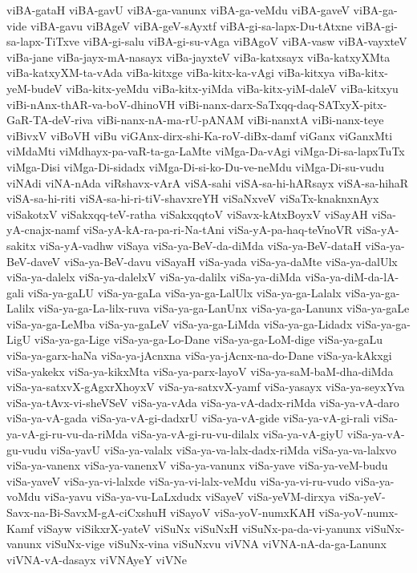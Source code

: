 {viBA-gataH
viBA-gavU
viBA-ga-vanunx
viBA-ga-veMdu
viBA-gaveV
viBA-ga-vide
viBA-gavu
viBAgeV
viBA-geV-sAyxtf
viBA-gi-sa-lapx-Du-tAtxne
viBA-gi-sa-lapx-TiTxve
viBA-gi-salu
viBA-gi-su-vAga
viBAgoV
viBA-vasw
viBA-vayxteV
viBa-jane
viBa-jayx-mA-nasayx
viBa-jayxteV
viBa-katxsayx
viBa-katxyXMta
viBa-katxyXM-ta-vAda
viBa-kitxge
viBa-kitx-ka-vAgi
viBa-kitxya
viBa-kitx-yeM-budeV
viBa-kitx-yeMdu
viBa-kitx-yiMda
viBa-kitx-yiM-daleV
viBa-kitxyu
viBi-nAnx-thAR-va-boV-dhinoVH
viBi-nanx-darx-SaTxqq-daq-SATxyX-pitx-GaR-TA-deV-riva
viBi-nanx-nA-ma-rU-pANAM
viBi-nanxtA
viBi-nanx-teye
viBivxV
viBoVH
viBu
viGAnx-dirx-shi-Ka-roV-diBx-damf
viGanx
viGanxMti
viMdaMti
viMdhayx-pa-vaR-ta-ga-LaMte
viMga-Da-vAgi
viMga-Di-sa-lapxTuTx
viMga-Disi
viMga-Di-sidadx
viMga-Di-si-ko-Du-ve-neMdu
viMga-Di-su-vudu
viNAdi
viNA-nAda
viRshavx-vArA
viSA-sahi
viSA-sa-hi-hARsayx
viSA-sa-hihaR
viSA-sa-hi-riti
viSA-sa-hi-ri-tiV-shavxreYH
viSaNxveV
viSaTx-knaknxnAyx
viSakotxV
viSakxqq-teV-ratha
viSakxqqtoV
viSavx-kAtxBoyxV
viSayAH
viSa-yA-cnajx-namf
viSa-yA-kA-ra-pa-ri-Na-tAni
viSa-yA-pa-haq-teVnoVR
viSa-yA-sakitx
viSa-yA-vadhw
viSaya
viSa-ya-BeV-da-diMda
viSa-ya-BeV-dataH
viSa-ya-BeV-daveV
viSa-ya-BeV-davu
viSayaH
viSa-yada
viSa-ya-daMte
viSa-ya-dalUlx
viSa-ya-dalelx
viSa-ya-dalelxV
viSa-ya-dalilx
viSa-ya-diMda
viSa-ya-diM-da-lA-gali
viSa-ya-gaLU
viSa-ya-gaLa
viSa-ya-ga-LalUlx
viSa-ya-ga-Lalalx
viSa-ya-ga-Lalilx
viSa-ya-ga-La-lilx-ruva
viSa-ya-ga-LanUnx
viSa-ya-ga-Lanunx
viSa-ya-gaLe
viSa-ya-ga-LeMba
viSa-ya-gaLeV
viSa-ya-ga-LiMda
viSa-ya-ga-Lidadx
viSa-ya-ga-LigU
viSa-ya-ga-Lige
viSa-ya-ga-Lo-Dane
viSa-ya-ga-LoM-dige
viSa-ya-gaLu
viSa-ya-garx-haNa
viSa-ya-jAcnxna
viSa-ya-jAcnx-na-do-Dane
viSa-ya-kAkxgi
viSa-yakekx
viSa-ya-kikxMta
viSa-ya-parx-layoV
viSa-ya-saM-baM-dha-diMda
viSa-ya-satxvX-gAgxrXhoyxV
viSa-ya-satxvX-yamf
viSa-yasayx
viSa-ya-seyxYva
viSa-ya-tAvx-vi-sheVSeV
viSa-ya-vAda
viSa-ya-vA-dadx-riMda
viSa-ya-vA-daro
viSa-ya-vA-gada
viSa-ya-vA-gi-dadxrU
viSa-ya-vA-gide
viSa-ya-vA-gi-rali
viSa-ya-vA-gi-ru-vu-da-riMda
viSa-ya-vA-gi-ru-vu-dilalx
viSa-ya-vA-giyU
viSa-ya-vA-gu-vudu
viSa-yavU
viSa-ya-valalx
viSa-ya-va-lalx-dadx-riMda
viSa-ya-va-lalxvo
viSa-ya-vanenx
viSa-ya-vanenxV
viSa-ya-vanunx
viSa-yave
viSa-ya-veM-budu
viSa-yaveV
viSa-ya-vi-lalxde
viSa-ya-vi-lalx-veMdu
viSa-ya-vi-ru-vudo
viSa-ya-voMdu
viSa-yavu
viSa-ya-vu-LaLxdudx
viSayeV
viSa-yeVM-dirxya
viSa-yeV-Savx-na-Bi-SavxM-gA-ciCxshuH
viSayoV
viSa-yoV-numxKAH
viSa-yoV-numx-Kamf
viSayw
viSikxrX-yateV
viSuNx
viSuNxH
viSuNx-pa-da-vi-yanunx
viSuNx-vanunx
viSuNx-vige
viSuNx-vina
viSuNxvu
viVNA
viVNA-nA-da-ga-Lanunx
viVNA-vA-dasayx
viVNAyeY
viVNe
}
